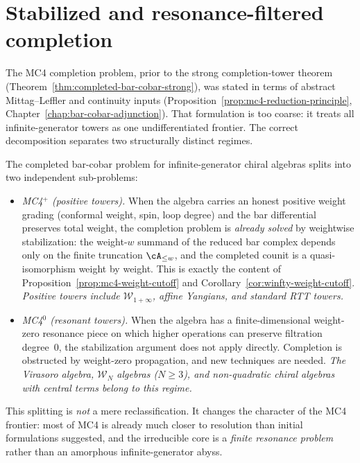 \section{Stabilized and resonance-filtered completion}
\label{sec:mc4-splitting}

The MC4 completion problem, prior to the strong completion-tower
theorem (Theorem~\ref{thm:completed-bar-cobar-strong}), was stated
in terms of abstract Mittag--Leffler and continuity inputs
(Proposition~\ref{prop:mc4-reduction-principle},
Chapter~\ref{chap:bar-cobar-adjunction}).  That formulation is too coarse:
it treats all infinite-generator towers as one undifferentiated
frontier.  The correct decomposition separates two
structurally distinct regimes.

\begin{remark}
\label{rem:mc4-splitting}
The completed bar-cobar problem for infinite-generator chiral
algebras splits into two independent sub-problems:
\begin{itemize}
\item \emph{MC4$^+$ (positive towers).}
  When the algebra carries an honest positive weight grading
  (conformal weight, spin, loop degree) and the bar differential
  preserves total weight, the completion problem is
  \emph{already solved} by weightwise stabilization:
  the weight-$w$ summand of the reduced bar complex depends only on
  the finite truncation $\cA_{\le w}$, and the completed
  counit is a quasi-isomorphism weight by weight.
  This is exactly the content of
  Proposition~\ref{prop:mc4-weight-cutoff} and
  Corollary~\ref{cor:winfty-weight-cutoff}.
  \emph{Positive towers include $\mathcal{W}_{1+\infty}$,
  affine Yangians, and standard RTT towers.}
\item \emph{MC4$^0$ (resonant towers).}
  When the algebra has a finite-dimensional weight-zero
  resonance piece on which higher operations can preserve
  filtration degree~$0$, the stabilization argument does not
  apply directly.  Completion is obstructed by weight-zero
  propagation, and new techniques are needed.
  \emph{The Virasoro algebra, $\mathcal{W}_N$ algebras
  ($N \ge 3$), and non-quadratic chiral algebras with central
  terms belong to this regime.}
\end{itemize}
This splitting is \emph{not} a mere reclassification.  It changes
the character of the MC4 frontier: most of MC4 is already much
closer to resolution than initial formulations suggested, and the
irreducible core is a \emph{finite resonance problem}
rather than an amorphous infinite-generator abyss.
\end{remark}

